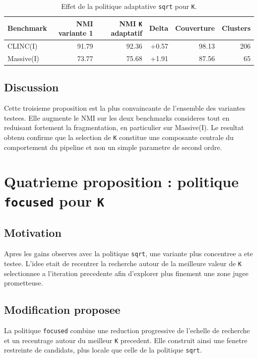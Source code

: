 \begin{table}[h]
  \centering
  \small
  \begin{tabular}{lrrrrr}
    \toprule
    Benchmark & NMI variante 1 & NMI \texttt{K} adaptatif & Delta & Couverture & Clusters \\
    \midrule
    CLINC(I) & 91.79 & 92.36 & +0.57 & 98.13 & 206 \\
    Massive(I) & 73.77 & 75.68 & +1.91 & 87.56 & 65 \\
    \bottomrule
  \end{tabular}
  \caption{Effet de la politique adaptative \texttt{sqrt} pour \texttt{K}.}
  \label{tab:third-improvement-results}
\end{table}

\subsection{Discussion}

Cette troisieme proposition est la plus convaincante de l'ensemble des
variantes testees. Elle augmente le NMI sur les deux benchmarks consideres tout
en reduisant fortement la fragmentation, en particulier sur Massive(I). Le
resultat obtenu confirme que la selection de \texttt{K} constitue une
composante centrale du comportement du pipeline et non un simple parametre de
second ordre.

\section{Quatrieme proposition : politique \texttt{focused} pour \texttt{K}}

\subsection{Motivation}

Apres les gains observes avec la politique \texttt{sqrt}, une variante plus
concentree a ete testee. L'idee etait de recentrer la recherche autour de la
meilleure valeur de \texttt{K} selectionnee a l'iteration precedente afin
d'explorer plus finement une zone jugee prometteuse.

\subsection{Modification proposee}

La politique \texttt{focused} combine une reduction progressive de l'echelle de
recherche et un recentrage autour du meilleur \texttt{K} precedent. Elle
construit ainsi une fenetre restreinte de candidats, plus locale que celle de
la politique \texttt{sqrt}.

